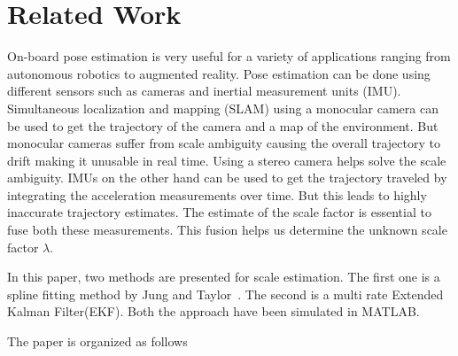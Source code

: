 \section{Related Work}
\label{related_work}

On-board pose estimation is very useful for a variety of applications ranging from autonomous robotics to augmented reality. Pose estimation can be done using different sensors such as cameras and inertial measurement units (IMU). Simultaneous localization and mapping (SLAM) using a monocular camera can be used to get the trajectory of the camera and a map of the environment. But monocular cameras suffer from scale ambiguity causing the overall trajectory to drift making it unusable in real time. Using a stereo camera helps solve the scale ambiguity. IMUs on the other hand can be used to get the trajectory traveled by integrating the acceleration measurements over time. But this leads to highly inaccurate trajectory estimates. The estimate of the scale factor is essential to fuse both these measurements. This fusion helps us determine the unknown scale factor $\lambda$.    

In this paper, two methods are presented for scale estimation. The first one is a spline fitting method by Jung and Taylor~\cite{jung2001camera}. The second is a multi rate Extended Kalman Filter(EKF). Both the approach have been simulated in MATLAB. 

The paper is organized as follows 